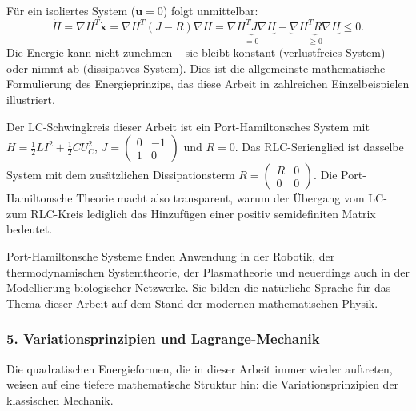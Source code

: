 ﻿\documentclass[12pt, a4paper]{article}
\begin{document}
	Für ein isoliertes System ($\mathbf{u} = 0$) folgt unmittelbar:
	\begin{equation}
		\dot{H} = \nabla H^T \dot{\mathbf{x}} = \nabla H^T (J - R) \nabla H = \underbrace{\nabla H^T J \nabla H}_{= 0} - \underbrace{\nabla H^T R \nabla H}_{\geq 0} \leq 0.
	\end{equation}
	Die Energie kann nicht zunehmen -- sie bleibt konstant (verlustfreies System) oder nimmt ab (dissipatves System). Dies ist die allgemeinste mathematische Formulierung des Energieprinzips, das diese Arbeit in zahlreichen Einzelbeispielen illustriert.

	Der LC-Schwingkreis dieser Arbeit ist ein Port-Hamiltonsches System mit $H = \frac{1}{2}LI^2 + \frac{1}{2}CU_C^2$, $J = \begin{pmatrix}0 & -1 \\ 1 & 0\end{pmatrix}$ und $R = 0$. Das RLC-Serienglied ist dasselbe System mit dem zusätzlichen Dissipationsterm $R = \begin{pmatrix}R & 0 \\ 0 & 0\end{pmatrix}$. Die Port-Hamiltonsche Theorie macht also transparent, warum der Übergang vom LC- zum RLC-Kreis lediglich das Hinzufügen einer positiv semidefiniten Matrix bedeutet.

	Port-Hamiltonsche Systeme finden Anwendung in der Robotik, der thermodynamischen Systemtheorie, der Plasmatheorie und neuerdings auch in der Modellierung biologischer Netzwerke. Sie bilden die natürliche Sprache für das Thema dieser Arbeit auf dem Stand der modernen mathematischen Physik.

	\subsubsection*{5. \quad Variationsprinzipien und Lagrange-Mechanik}

	Die quadratischen Energieformen, die in dieser Arbeit immer wieder auftreten, weisen auf eine tiefere mathematische Struktur hin: die Variationsprinzipien der klassischen Mechanik.
\end{document}
